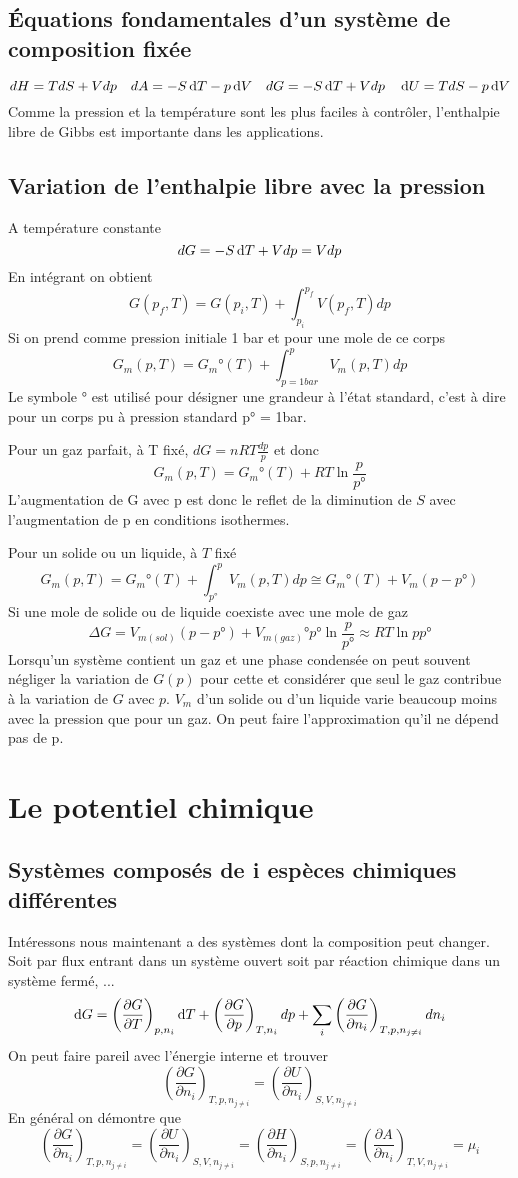 \subsection{Équations fondamentales d'un système de composition fixée}
\[ dH = TdS+Vdp \quad dA = -S\operatorname{d}\! T -p\operatorname{d}\! V \quad
dG = -S\operatorname{d}\! T +Vdp \quad \operatorname{d}\! U = TdS-p\operatorname{d}\! V \]
Comme la pression et la température sont les plus faciles à contrôler,
l'enthalpie libre de Gibbs est importante dans les applications.

\subsection{Variation de l'enthalpie libre avec la pression}
A température constante
\[ dG = -S\operatorname{d}\! T+Vdp = Vdp \]
En intégrant on obtient
\[ G(p_f,T) = G(p_i,T)+\int_{p_i}^{p_f}V(p_f,T)dp \]
Si on prend comme pression initiale 1 bar et pour une mole de ce corps
\[ G_m(p,T) = G_m°(T)+\int_{p = 1bar}^{p}V_m(p,T)dp \]
Le symbole ° est utilisé pour désigner une grandeur à l'état standard,
c'est à dire pour un corps pu à pression standard p° = 1bar.

Pour un gaz parfait, à T fixé, $dG = nRT\frac{dp}p$ et donc
\[ G_m(p,T) = G_m°(T)+RT \ln \frac {p}{p°} \]
L'augmentation de G avec p est donc le reflet de la diminution de $S$
avec l'augmentation de p en conditions isothermes.

Pour un solide ou un liquide, à $T$ fixé
\[ G_m(p,T) = G_m°(T)+\int_{p°}^{p}V_m(p,T)dp \cong G_m°(T)+V_m(p-p°) \]
Si une mole de solide ou de liquide coexiste avec une mole de gaz
\[ \Delta G =
V_{m(sol)}(p-p°)+V_{m(gaz)}°p°\ln \frac{p}{p°} \approx RT \ln {p}{p°} \]
Lorsqu'un système contient un gaz et une phase condensée
on peut souvent négliger la variation de $G(p)$ pour cette et
considérer que seul le gaz contribue à la variation de $G$ avec $p$.
$V_m$ d'un solide ou d'un liquide varie beaucoup
moins avec la pression que pour un gaz.
On peut faire l'approximation qu'il ne dépend pas de p.

\section{Le potentiel chimique}
\subsection{Systèmes composés de i espèces chimiques différentes}
Intéressons nous maintenant a des systèmes dont la composition peut changer.
Soit par flux entrant dans un système ouvert
soit par réaction chimique dans un système fermé, ...
\[ \operatorname{d}\! G = \left(\frac{\partial G}{\partial T}\right)_{p,n_i}\operatorname{d}\! T +
\left(\frac{\partial G}{\partial p}\right)_{T,n_i}dp +
\sum_i \left(\frac{\partial G}{\partial n_i}\right)_{T,p,n_{j\neq i}}dn_i \]
On peut faire pareil avec l'énergie interne et trouver
\[ \left(\frac{\partial G}{\partial n_i}\right)_{T,p,n_{j\neq i}} =
\left(\frac{\partial U}{\partial n_i}\right)_{S,V,n_{j\neq i}} \]
En général on démontre que
\[ \left(\frac{\partial G}{\partial n_i}\right)_{T,p,n_{j\neq i}} =
\left(\frac{\partial U}{\partial n_i}\right)_{S,V,n_{j\neq i}} =
\left(\frac{\partial H}{\partial n_i}\right)_{S,p,n_{j\neq i}} =
\left(\frac{\partial A}{\partial n_i}\right)_{T,V,n_{j\neq i}} = \mu_i \]

